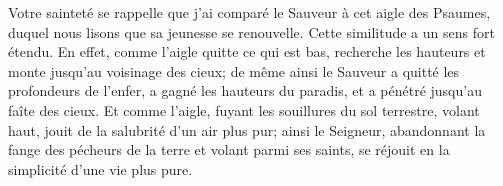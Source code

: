 Votre sainteté se rappelle que j’ai comparé le Sauveur à cet aigle des Psaumes,
	duquel nous lisons que sa jeunesse se renouvelle.
Cette similitude a un sens fort étendu.
En effet, comme l’aigle quitte ce qui est bas,
	recherche les hauteurs et monte jusqu’au voisinage des cieux;
	de même ainsi le Sauveur a quitté les profondeurs de l’enfer,
	a gagné les hauteurs du paradis, et a pénétré jusqu’au faîte des cieux.
Et comme l’aigle, fuyant les souillures du sol terrestre,
	volant haut, jouit de la salubrité d’un air plus pur;
ainsi le Seigneur,
	abandonnant la fange des pécheurs de la terre et volant parmi ses saints,
	se réjouit en la simplicité d’une vie plus pure.
